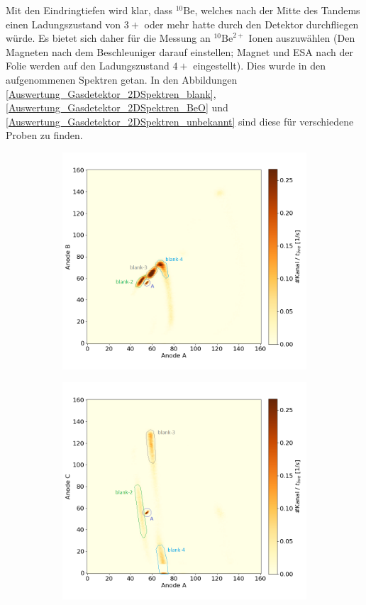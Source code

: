 Mit den Eindringtiefen wird klar, dass $^{10}\text{Be}$, welches nach der Mitte des Tandems einen Ladungszustand von $3+$ oder mehr hatte durch den Detektor durchfliegen würde.
Es bietet sich daher für die Messung an $^{10}\text{Be}^{2+}$ Ionen auszuwählen (Den Magneten nach dem Beschleuniger darauf einstellen; Magnet und ESA nach der Folie werden auf den Ladungszustand $4+$ eingestellt).
Dies wurde in den aufgenommenen Spektren getan.
In den Abbildungen \ref{Auswertung_Gasdetektor_2DSpektren_blank}, \ref{Auswertung_Gasdetektor_2DSpektren_BeO} und \ref{Auswertung_Gasdetektor_2DSpektren_unbekannt} sind diese für verschiedene Proben zu finden.
\begin{figure}[H]
    \centering
    \begin{subfigure}{0.47\textwidth}
        \centering
        \includegraphics[width=\linewidth]{Pictures/Gasdetektor/3_blank_AB.png}
    \end{subfigure}
    \begin{subfigure}{0.47\textwidth}
        \centering
        \includegraphics[width=\linewidth]{Pictures/Gasdetektor/3_blank_AC.png}

\end{subfigure}
\end{figure}
